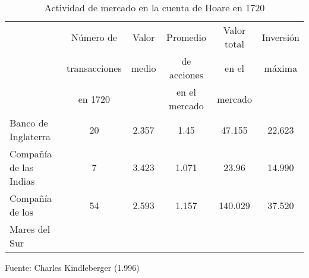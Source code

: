 \begin{table}
    \begin{tabular}{lccccc}
                           & Número de        & Valor & Promedio      & Valor total & Inversión \\
                           & transacciones    & medio & de acciones   & en el       & máxima    \\
                           & en 1720          &       & en el mercado & mercado     &           \\ 
    \cline{2-6}
    Banco de Inglaterra    & 20               & 2.357 & 1.45          & 47.155      & 22.623    \\
    Compañía de las Indias & 7                & 3.423 & 1.071         & 23.96       & 14.990    \\
    Compañía de los        & 54               & 2.593 & 1.157         & 140.029     & 37.520    \\
    Mares del Sur          &                  &       &               &             &           \\
    \hline
    \end{tabular}
    
	\center
	\footnotesize
	Fuente: Charles Kindleberger (1.996)
	
    \caption {Actividad de mercado en la cuenta de Hoare en 1720}
	\label{tab:cuentaHoare}
\end{table}
